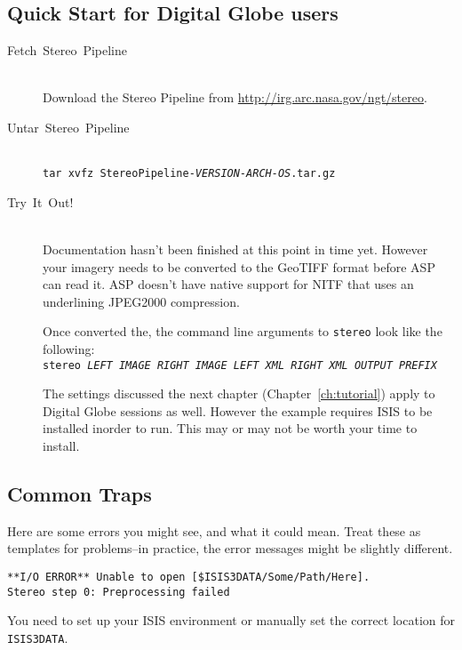 \subsection{Quick Start for Digital Globe users}
\begin{description}

\item[{Fetch~Stereo~Pipeline}] ~\\
Download the Stereo Pipeline from \url{http://irg.arc.nasa.gov/ngt/stereo}.

\item[{Untar~Stereo~Pipeline}] ~\\
\texttt{tar xvfz StereoPipeline-\textit{VERSION-ARCH-OS}.tar.gz}

\item [{Try~It~Out!}] ~\\

Documentation hasn't been finished at this point in time yet. However
your imagery needs to be converted to the GeoTIFF format before ASP
can read it. ASP doesn't have native support for NITF that uses an
underlining JPEG2000 compression.

Once converted the, the command line arguments to \texttt{stereo} look
like the following: ~\\
\texttt{stereo \textit{LEFT IMAGE} \textit{RIGHT IMAGE} \textit{LEFT XML} \textit{RIGHT XML} \textit{OUTPUT PREFIX}}

The settings discussed the next chapter (Chapter~\ref{ch:tutorial})
apply to Digital Globe sessions as well. However the example requires
ISIS to be installed inorder to run. This may or may not be worth your
time to install.
\end{description}

\subsection{Common Traps}

Here are some errors you might see, and what it could mean. Treat
these as templates for problems--in practice, the error messages might
be slightly different.

\begin{verbatim}
**I/O ERROR** Unable to open [$ISIS3DATA/Some/Path/Here].
Stereo step 0: Preprocessing failed
\end{verbatim}

You need to set up your ISIS environment or manually set the correct location for \texttt{ISIS3DATA}.

